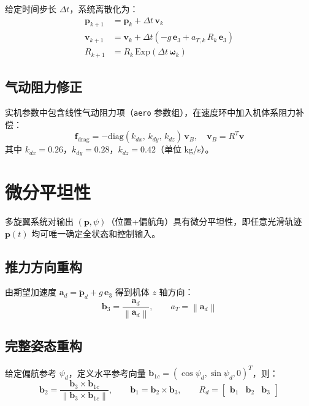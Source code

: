 \documentclass[UTF8, a4paper, 11pt]{ctexart}
\newcommand{\bp}{\mathbf{p}}
\newcommand{\bv}{\mathbf{v}}
\newcommand{\bw}{\boldsymbol{\omega}}
\newcommand{\Exp}{\mathrm{Exp}}
\newcommand{\diag}{\mathrm{diag}}
\newcommand{\norm}[1]{\left\|#1\right\|}
\begin{document}
给定时间步长 $\Delta t$，系统离散化为：
\begin{align}
  \bp_{k+1} &= \bp_k + \Delta t\,\bv_k \\
  \bv_{k+1} &= \bv_k + \Delta t\!\left(-g\,\mathbf{e}_3 + a_{T,k}\,R_k\,\mathbf{e}_3\right) \\
  R_{k+1}   &= R_k\,\Exp\!\left(\Delta t\,\bw_k\right)
\end{align}

\subsection{气动阻力修正}

实机参数中包含线性气动阻力项（\texttt{aero} 参数组），在速度环中加入机体系阻力补偿：
\begin{equation}
  \mathbf{f}_{\text{drag}} = -\diag(k_{dx},\,k_{dy},\,k_{dz})\,\bv_B, \quad \bv_B = R^T\bv
\end{equation}
其中 $k_{dx}=0.26$，$k_{dy}=0.28$，$k_{dz}=0.42$（单位 kg/s）。

\section{微分平坦性}

多旋翼系统对输出 $(\bp,\psi)$（位置+偏航角）具有微分平坦性，即任意光滑轨迹 $\bp(t)$ 均可唯一确定全状态和控制输入。

\subsection{推力方向重构}

由期望加速度 $\mathbf{a}_d = \ddot{\bp}_d + g\,\mathbf{e}_3$ 得到机体 $z$ 轴方向：
\begin{equation}
  \mathbf{b}_3 = \frac{\mathbf{a}_d}{\norm{\mathbf{a}_d}}, \qquad a_T = \norm{\mathbf{a}_d}
\end{equation}

\subsection{完整姿态重构}

给定偏航参考 $\psi_d$，定义水平参考向量 $\mathbf{b}_{1c} = (\cos\psi_d,\sin\psi_d,0)^T$，则：
\begin{equation}
  \mathbf{b}_2 = \frac{\mathbf{b}_3 \times \mathbf{b}_{1c}}{\norm{\mathbf{b}_3 \times \mathbf{b}_{1c}}}, \qquad
  \mathbf{b}_1 = \mathbf{b}_2 \times \mathbf{b}_3, \qquad
  R_d = \begin{bmatrix}\mathbf{b}_1 & \mathbf{b}_2 & \mathbf{b}_3\end{bmatrix}
\end{equation}
\end{document}
